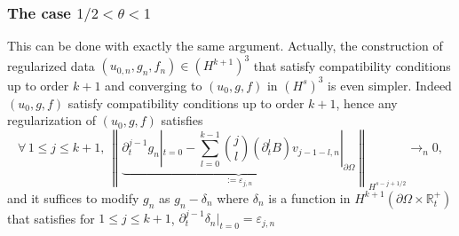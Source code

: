 \documentclass[10pt]{amsart}
\theoremstyle{definition}\newtheorem{defi}[theo]{Definition}\newtheorem{rema}[theo]{Remark}\newtheorem{exam}[theo]{Example}\newtheorem{exem}[theo]{Example}\newtheorem{nota}[theo]{Notation}
\newcommand{\R}{\mathbb{R}}
\let\oldforall\forall
\renewcommand*{\forall}{\mathrel{\oldforall}}
\begin{document}
\subsubsection{The case $1/2<\theta<1$}
This can be done with exactly the same argument. Actually, the construction of regularized data $(u_{0,n},g_n,f_n)\in (H^{k+1})^3$ that satisfy compatibility conditions up to order $k+1$ and converging to $(u_0,g,f)$ in $(H^s)^3$ is even simpler. Indeed $(u_0,g,f)$ satisfy compatibility conditions up to order $k+1$, hence any regularization of $(u_0,g,f)$ satisfies
\[
\forall\,1\leq j\leq k+1,\
\left\|\underbrace{\partial_t^{j-1}g_n|_{t=0} -\sum_{l=0}^{k-1}\binom{j}{l} \left(\partial_t^lB\right)v_{j-1-l,n}|_{\partial\Omega}}_{:=\varepsilon_{j,n}}\right\|_{H^{s-j+1/2}}\longrightarrow_{n} 0,
\]
and it suffices to modify $g_n$ as $g_n-\delta_n$ where $\delta_n$ is a function in $H^{k+1}(\partial\Omega\times\R_t^+)$ that satisfies for $1\leq j\leq k+1$, $\partial_t^{j-1}\delta_n|_{t=0}=\varepsilon_{j,n}$
\end{document}
